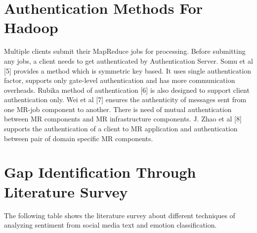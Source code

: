 \documentclass[oneside,a4paper,12pt]{pictreport}
\begin{document}
\section{Authentication Methods For Hadoop}
\hspace{1.1cm}Multiple clients submit their MapReduce jobs for processing. Before submitting any jobs, a client needs to get authenticated by Authentication Server. Somu et al [5] provides a method which is symmetric key based. It uses single authentication factor, supports only gate-level authentication and has more communication overheads. Rubika method of authentication [6] is also designed to support client authentication only. Wei et al [7] ensures the authenticity of messages sent from one MR-job component to another. There is need of mutual authentication between MR components and MR infrastructure components. J. Zhao et al [8] supports the authentication of a client to MR application and authentication between pair of domain specific MR components.


\section{Gap Identification Through Literature Survey}

The following table shows the literature survey about different techniques of analyzing sentiment from social media text and emotion classification.
\end{document}
